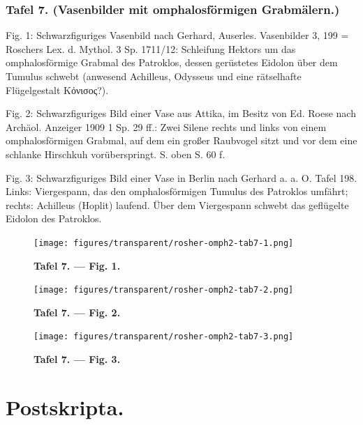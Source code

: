 \documentclass[a4paper, 11pt, oneside]{article}
\begin{document}
\subsubsection{Tafel 7. (Vasenbilder mit omphalosförmigen Grabmälern.)}

Fig. 1: Schwarzfiguriges Vasenbild nach Gerhard, Auserles. Vasenbilder 3, 199 = Roschers Lex. d. Mythol. 3 Sp. 1711/12: Schleifung Hektors um das omphalosförmige Grabmal des Patroklos, dessen gerüstetes Eidolon über dem Tumulus schwebt (anwesend Achilleus, Odysseus und eine rätselhafte Flügelgestalt Κόνισος?).

Fig. 2: Schwarzfiguriges Bild einer Vase aus Attika, im Besitz von Ed. Roese nach Archäol. Anzeiger 1909 1 Sp. 29 ff.: Zwei Silene rechts und links von einem omphalosförmigen Grabmal, auf dem ein großer Raubvogel sitzt und vor dem eine schlanke Hirschkuh vorüberspringt. S. oben S. 60 f.

Fig. 3: Schwarzfiguriges Bild einer Vase in Berlin nach Gerhard a. a. O. Tafel 198. Links: Viergespann, das den omphalosförmigen Tumulus des Patroklos umfährt; rechts: Achilleus (Hoplit) laufend. Über dem Viergespann schwebt das geflügelte Eidolon des Patroklos.
\clearpage
\begin{landscape}
\vspace*{\fill}
\begin{figure}[H]
\centering
\texttt{[image: figures/transparent/rosher-omph2-tab7-1.png]}
\caption{\bfseries Tafel 7. --- Fig. 1.}
\end{figure}
\vspace*{\fill}
\clearpage
\vspace*{\fill}
\begin{figure}[H]
\centering
\texttt{[image: figures/transparent/rosher-omph2-tab7-2.png]}
\caption{\bfseries Tafel 7. --- Fig. 2.}
\end{figure}
\vspace*{\fill}
\clearpage
\vspace*{\fill}
\begin{figure}[H]
\centering
\texttt{[image: figures/transparent/rosher-omph2-tab7-3.png]}
\caption{\bfseries Tafel 7. --- Fig. 3.}
\end{figure}
\vspace*{\fill}
\clearpage
\end{landscape}
\section{Postskripta.}
\end{document}
